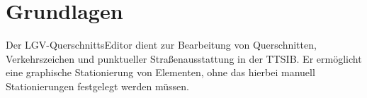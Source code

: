 \documentclass[a4paper,11pt,bibliography=totoc, listof=totoc,titlepage]{scrartcl}
\renewcommand{\arraystretch}{1.5}
\begin{document}


\providecommand{\citeTwo}[4]{\citep[{\citealp[#1]{#2};}][#3]{#4}} 
\providecommand{\citeThree}[6]{\citep[{\citealp[#1]{#2}; \citealp[#3]{#4};}][#5]{#6}} 
\providecommand{\citeFour}[8]{\citep[{\citealp[#1]{#2}; \citealp[#3]{#4}; \citealp[#5]{#6};}][#7]{#8}}

\newpage

\tableofcontents
\newpage

\setcounter{page}{1} 

\section{Grundlagen}
Der LGV-QuerschnittsEditor dient zur Bearbeitung von \Gls{Querschnitt}en, Verkehrszeichen und punktueller Straßenausstattung in der TTSIB. Er ermöglicht eine graphische Stationierung von Elementen, ohne das hierbei manuell Stationierungen festgelegt werden müssen.
\end{document}
